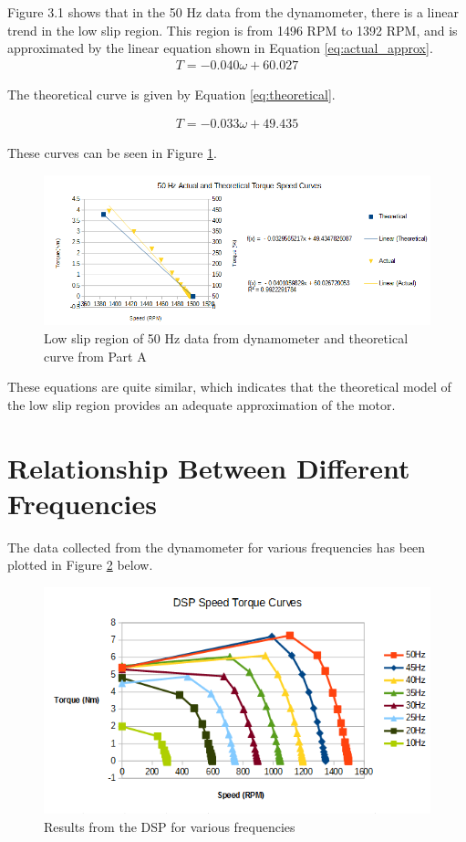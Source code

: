 \documentclass[12pt]{report}
\begin{document}
	Figure 3.1 shows that in the 50 Hz data from the dynamometer, there is a linear trend in the low slip region. This region is from 1496 RPM to 1392 RPM, and is approximated by the linear equation shown in Equation \ref{eq:actual_approx}.
	\begin{align}
		T = -0.040\omega + 60.027
		\label{eq:actual_approx}
	\end{align}
	
	The theoretical curve is given by Equation \ref{eq:theoretical}.
	
	\begin{align}
	T = -0.033\omega + 49.435
	\label{eq:theoretical}
	\end{align}
	
	These curves can be seen in Figure \ref{fig:pC_3}.
	
	\begin{figure}[h]
		\centering
		\includegraphics[width=\textwidth]{pC_3}
		\caption{Low slip region of 50 Hz data from dynamometer and theoretical curve from Part A}
		\label{fig:pC_3}
	\end{figure}
	
	These equations are quite similar, which indicates that the theoretical model of the low slip region provides an adequate approximation of the motor. 
	
	\section{Relationship Between Different Frequencies}
	
	The data collected from the dynamometer for various frequencies has been plotted in Figure \ref{fig:pC_4} below.
	
	\begin{figure}[H]
		\centering
		\includegraphics[scale=0.8]{DSP_pC_1}
		\caption{Results from the DSP for various frequencies}
		\label{fig:pC_4}	
	\end{figure}
	
\end{document}
